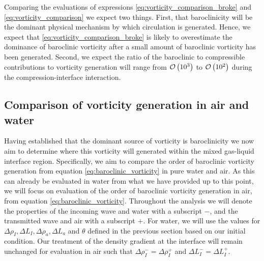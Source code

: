 Comparing the evaluations of expressions
\eqref{eq:vorticity_comparison_broke} and
\eqref{eq:vorticity_comparison} we expect two things. First, that
baroclinicity will be the dominant physical mechanism by which
circulation is generated. Hence, we expect
that \eqref{eq:vorticity_comparison_broke} is likely to overestimate
the dominance of baroclinic vorticity after a small amount of
baroclinic vorticity has been generated. Second, we expect the ratio
of the baroclinic to compressible contributions to vorticity
generation will range from $\mathcal{O}\left(10^3\right)$ to $\mathcal{O}\left(10^2\right)$ during
the compression-interface interaction.

\subsection{Comparison of vorticity generation in air and water}
Having established that the dominant source of vorticity is
baroclinicity we now aim to determine where this vorticity will
generated within the mixed gas-liquid interface region. Specifically, we
aim to compare the order of baroclinic vorticity generation from
equation \eqref{eq:baroclinic_vorticity} in pure water and air. As
this can already be evaluated in water from what we have provided up
to this point, we will focus on evaluation of the order of baroclinic
vorticity generation in air, from equation
\eqref{eq:baroclinic_vorticity}. Throughout the analysis we will
denote the properties of the incoming wave and water with a subscript
$-$, and the transmitted wave and air with a subscript $+$. For water,
we will use the values for
$\Delta \rho_I, \Delta L_I, \Delta \rho_a, \Delta L_a$ and $\theta$
defined in the previous section based on our initial condition. Our
treatment of the density gradient at the interface will remain
unchanged for evaluation in air such that
$\Delta \rho_I^-=\Delta \rho_I^+$ and $\Delta L_I^-=\Delta L_I^+$.

